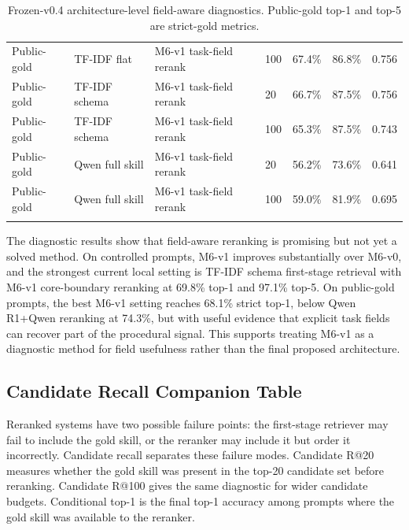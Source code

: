 {\begin{longtable}{@{}p{}p{}p{}p{}rrr@{}}
Public-gold & TF-IDF flat & M6-v1 task-field rerank & 100 & 67.4\% & 86.8\% & 0.756 \\
Public-gold & TF-IDF schema & M6-v1 task-field rerank & 20 & 66.7\% & 87.5\% & 0.756 \\
Public-gold & TF-IDF schema & M6-v1 task-field rerank & 100 & 65.3\% & 87.5\% & 0.743 \\
Public-gold & Qwen full skill & M6-v1 task-field rerank & 20 & 56.2\% & 73.6\% & 0.641 \\
Public-gold & Qwen full skill & M6-v1 task-field rerank & 100 & 59.0\% & 81.9\% & 0.695 \\
\caption{Frozen-v0.4 architecture-level field-aware diagnostics. Public-gold top-1 and top-5 are strict-gold metrics.}
\label{tab:field-aware-diagnostics-v04}
\end{longtable}
}

The diagnostic results show that field-aware reranking is promising but not yet a solved method. On controlled prompts, M6-v1 improves substantially over M6-v0, and the strongest current local setting is TF-IDF schema first-stage retrieval with M6-v1 core-boundary reranking at 69.8\% top-1 and 97.1\% top-5. On public-gold prompts, the best M6-v1 setting reaches 68.1\% strict top-1, below Qwen R1+Qwen reranking at 74.3\%, but with useful evidence that explicit task fields can recover part of the procedural signal. This supports treating M6-v1 as a diagnostic method for field usefulness rather than the final proposed architecture.

\subsection{Candidate Recall Companion Table}

Reranked systems have two possible failure points: the first-stage retriever may fail to include the gold skill, or the reranker may include it but order it incorrectly. Candidate recall separates these failure modes. Candidate R@20 measures whether the gold skill was present in the top-20 candidate set before reranking. Candidate R@100 gives the same diagnostic for wider candidate budgets. Conditional top-1 is the final top-1 accuracy among prompts where the gold skill was available to the reranker.

